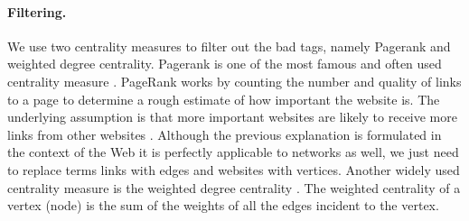 \paragraph{Filtering.} We use two centrality measures to filter out the bad tags, namely Pagerank and weighted degree centrality. Pagerank is one of the most famous and often used centrality measure \cite{journals/corr/abs-1012-4872,10.4137/GRSB.S702,junker2008analysis}. PageRank works by counting the number and quality of links to a page to determine a rough estimate of how important the website is. The underlying assumption is that more important websites are likely to receive more links from other websites \cite{ilprints422}. Although the previous explanation is formulated in the context of the Web it is perfectly applicable to networks as well, we just need to replace terms links with edges and websites with vertices. Another widely used centrality measure is the weighted degree centrality \cite{citeulike:278955}. The weighted centrality of a vertex (node) is the sum of the weights of all the edges incident to the vertex.

